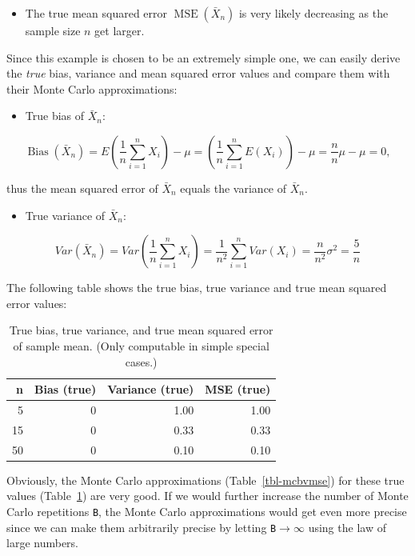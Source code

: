 \documentclass[
  letterpaper,
  DIV=11,
  numbers=noendperiod]{scrreprt}
\providecommand{\tightlist}{%
  \setlength{\itemsep}{0pt}\setlength{\parskip}{0pt}}\usepackage{longtable,booktabs,array}
\theoremstyle{definition}
\theoremstyle{plain}
\theoremstyle{plain}
\theoremstyle{remark}
\begin{document}
\begin{itemize}
\tightlist
\item
  The true mean squared error \(\operatorname{MSE}(\bar{X}_n)\) is very
  likely decreasing as the sample size \(n\) get larger.
\end{itemize}

Since this example is chosen to be an extremely simple one, we can
easily derive the \emph{true} bias, variance and mean squared error
values and compare them with their Monte Carlo approximations:

\begin{itemize}
\tightlist
\item
  True bias of \(\bar{X}_n\):
\end{itemize}

\[
\operatorname{Bias}\left(\bar{X}_n\right)=E\left(\frac{1}{n}\sum_{i=1}^nX_i\right) - \mu = \left(\frac{1}{n}\sum_{i=1}^nE(X_i)\right) -\mu = \frac{n}{n}\mu-\mu =0,
\]

thus the mean squared error of \(\bar{X}_n\) equals the variance of
\(\bar{X}_n\).

\begin{itemize}
\tightlist
\item
  True variance of \(\bar{X}_n\):
\end{itemize}

\[
Var\left(\bar{X}_n\right)=Var\left(\frac{1}{n}\sum_{i=1}^nX_i\right) = \frac{1}{n^2} \sum_{i=1}^nVar\left(X_i\right) = \frac{n}{n^2}\sigma^2 = \frac{5}{n} 
\]

The following table shows the true bias, true variance and true mean
squared error values:

\hypertarget{tbl-truebvmse}{}
\begin{table}
\caption{\label{tbl-truebvmse}True bias, true variance, and true mean squared error of sample mean.
(Only computable in simple special cases.) }\tabularnewline

\centering
\begin{tabular}[t]{r|r|r|r}
\hline
n & Bias (true)  & Variance (true) & MSE (true) \\
\hline
5 & 0 & 1.00 & 1.00\\
\hline
15 & 0 & 0.33 & 0.33\\
\hline
50 & 0 & 0.10 & 0.10\\
\hline
\end{tabular}
\end{table}

Obviously, the Monte Carlo approximations (Table~\ref{tbl-mcbvmse}) for
these true values (Table~\ref{tbl-truebvmse}) are very good. If we would
further increase the number of Monte Carlo repetitions \texttt{B}, the
Monte Carlo approximations would get even more precise since we can make
them arbitrarily precise by letting \texttt{B}\(\to\infty\) using the
law of large numbers.
\end{document}
